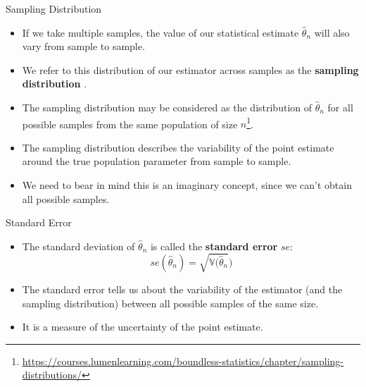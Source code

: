 \documentclass[handout]{beamer}
\begin{document}
\begin{frame}{Sampling Distribution}

\scriptsize{

\begin{itemize}
\item If we take multiple samples, the value of our statistical estimate $\hat{\theta}_n$ will also vary from sample to sample.

\item We refer to this distribution of our estimator across samples as the   \textbf{sampling distribution} \cite{poldrack2019statistical}.

\item The sampling distribution may be considered as the distribution of  $\hat{\theta}_n$ for all possible samples from the same population of size $n$\footnote{\url{https://courses.lumenlearning.com/boundless-statistics/chapter/sampling-distributions/}}.

\item The sampling distribution describes the variability of the point estimate around the true population parameter from sample to sample. 

\item We need to bear in mind this is an imaginary concept, since we can't obtain all possible samples.


\end{itemize}

} 
\end{frame}


\begin{frame}{Standard Error}

\scriptsize{

\begin{itemize}
\item The standard deviation of $\hat{\theta}_n$ is called the \textbf{standard error} $se$:
\begin{displaymath}
se(\hat{\theta}_n)=\sqrt{\mathbb{V}(\hat{\theta}_n})
\end{displaymath}
\item The standard error tells us about the variability of the estimator (and the sampling distribution) between all possible samples of the same size.
\item It is a measure of the uncertainty of the point estimate.
\end{itemize}

} 
\end{frame}
\end{document}
